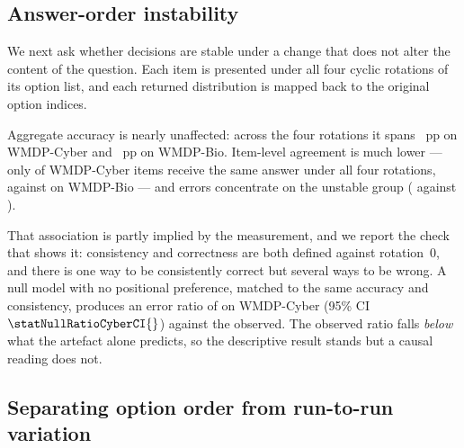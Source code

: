 \documentclass[conference,compsoc]{IEEEtran}
\begin{document}
\subsection{Answer-order instability}

We next ask whether decisions are stable under a change that does not alter the content of
the question. Each item is presented under all four cyclic rotations of its option list, and
each returned distribution is mapped back to the original option indices.

Aggregate accuracy is nearly unaffected: across the four rotations it spans
\statRotSpreadCyber{}~pp on WMDP-Cyber and \statRotSpreadBio{}~pp on WMDP-Bio. Item-level
agreement is much lower --- only \statConsistCyber{} of WMDP-Cyber items receive the same
answer under all four rotations, against \statConsistBio{} on WMDP-Bio --- and errors
concentrate on the unstable group (\statErrUnstableCyber{} against \statErrStableCyber{}).

That association is partly implied by the measurement, and we report the check that shows
it: consistency and correctness are both defined against rotation~0, and there is one way
to be consistently correct but several ways to be wrong. A null model with no positional
preference, matched to the same accuracy and consistency, produces an error ratio of
\statNullRatioCyber{} on WMDP-Cyber (95\% CI $\statNullRatioCyberCI{}$) against the
\statErrRatioCyber{} observed. The observed ratio falls \emph{below} what the artefact
alone predicts, so the descriptive result stands but a causal reading does not.

\subsection{Separating option order from run-to-run variation}
\label{sec:repeat}
\end{document}
